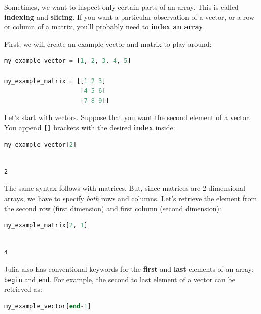 \documentclass[
  notoc %
]{tufte-book}
\newcommand{\passthrough}[1]{#1}
\begin{document}
Sometimes, we want to inspect only certain parts of an array. This is
called \textbf{indexing} and \textbf{slicing}. If you want a particular
observation of a vector, or a row or column of a matrix, you'll probably
need to \textbf{index an array}.

First, we will create an example vector and matrix to play around:

\begin{lstlisting}[language=Julia]
my_example_vector = [1, 2, 3, 4, 5]

my_example_matrix = [[1 2 3]
                     [4 5 6]
                     [7 8 9]]
\end{lstlisting}

Let's start with vectors. Suppose that you want the second element of a
vector. You append \passthrough{\lstinline![]!} brackets with the
desired \textbf{index} inside:

\begin{lstlisting}[language=Julia]
my_example_vector[2]
\end{lstlisting}

\begin{lstlisting}[language=Output]

2

\end{lstlisting}

The same syntax follows with matrices. But, since matrices are
2-dimensional arrays, we have to specify \emph{both} rows and columns.
Let's retrieve the element from the second row (first dimension) and
first column (second dimension):

\begin{lstlisting}[language=Julia]
my_example_matrix[2, 1]
\end{lstlisting}

\begin{lstlisting}[language=Output]

4

\end{lstlisting}

Julia also has conventional keywords for the \textbf{first} and
\textbf{last} elements of an array: \passthrough{\lstinline!begin!} and
\passthrough{\lstinline!end!}. For example, the second to last element
of a vector can be retrieved as:

\begin{lstlisting}[language=Julia]
my_example_vector[end-1]
\end{lstlisting}
\end{document}
